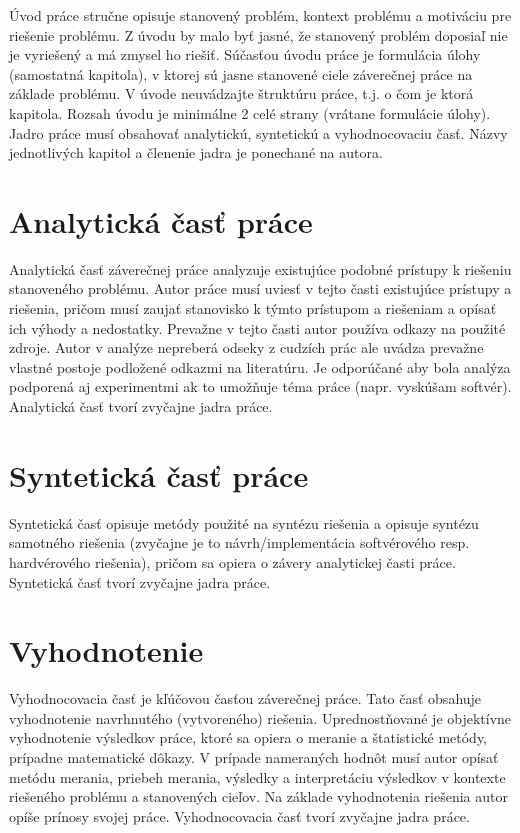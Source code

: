 Úvod práce stručne opisuje stanovený problém, kontext problému a motiváciu pre riešenie problému. Z úvodu by malo byť jasné, že stanovený problém doposiaľ nie je vyriešený a má zmysel ho riešiť. Súčasťou úvodu práce je formulácia úlohy (samostatná kapitola), v ktorej sú jasne stanovené ciele záverečnej práce na základe problému. V úvode neuvádzajte štruktúru práce, t.j. o čom je ktorá kapitola. Rozsah úvodu je minimálne 2 celé strany (vrátane formulácie úlohy). Jadro práce musí obsahovať analytickú, syntetickú a vyhodnocovaciu časť. Názvy jednotlivých kapitol a členenie jadra je ponechané na autora.
    
\section{Analytická časť práce}

Analytická časť záverečnej práce analyzuje existujúce podobné prístupy k riešeniu stanoveného problému. Autor práce musí uviesť v tejto časti existujúce prístupy a riešenia, pričom musí zaujať stanovisko k týmto prístupom a riešeniam a opísať ich výhody a nedostatky. Prevažne v tejto časti autor používa odkazy na použité zdroje. Autor v analýze nepreberá odseky z cudzích prác ale uvádza prevažne vlastné postoje podložené odkazmi na literatúru. Je odporúčané aby bola analýza podporená aj experimentmi ak to umožňuje téma práce (napr. vyskúšam softvér). Analytická časť tvorí zvyčajne  jadra práce.

\section{Syntetická časť práce}

Syntetická časť opisuje metódy použité na syntézu riešenia a opisuje syntézu samotného riešenia (zvyčajne je to návrh/implementácia softvérového resp. hardvérového riešenia), pričom sa opiera o závery analytickej časti práce. Syntetická časť tvorí zvyčajne  jadra práce.

\section{Vyhodnotenie}

Vyhodnocovacia časť je kľúčovou časťou záverečnej práce. Tato časť obsahuje vyhodnotenie navrhnutého (vytvoreného) riešenia. Uprednostňované je objektívne vyhodnotenie výsledkov práce, ktoré sa opiera o meranie a štatistické metódy, prípadne matematické dôkazy. V prípade nameraných hodnôt musí autor opísať metódu merania, priebeh merania, výsledky a interpretáciu výsledkov v kontexte riešeného problému a stanovených cieľov. Na základe vyhodnotenia riešenia autor opíše prínosy svojej práce. Vyhodnocovacia časť tvorí zvyčajne  jadra práce.

